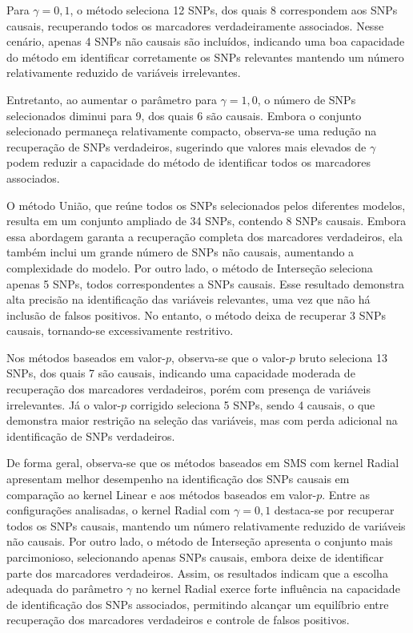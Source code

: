 \documentclass[
    12pt,
    a4paper,
    oneside,
    english,
    french,
    spanish,
    brazil
    ]{abntex2}
\begin{document}
Para $\gamma = 0{,}1$, o método seleciona 12 SNPs, dos quais 8 correspondem aos SNPs causais, recuperando todos os marcadores verdadeiramente associados. Nesse cenário, apenas 4 SNPs não causais são incluídos, indicando uma boa capacidade do método em identificar corretamente os SNPs relevantes mantendo um número relativamente reduzido de variáveis irrelevantes.

Entretanto, ao aumentar o parâmetro para $\gamma = 1{,}0$, o número de SNPs selecionados diminui para 9, dos quais 6 são causais. Embora o conjunto selecionado permaneça relativamente compacto, observa-se uma redução na recuperação de SNPs verdadeiros, sugerindo que valores mais elevados de $\gamma$ podem reduzir a capacidade do método de identificar todos os marcadores associados.

O método União, que reúne todos os SNPs selecionados pelos diferentes modelos, resulta em um conjunto ampliado de 34 SNPs, contendo 8 SNPs causais. Embora essa abordagem garanta a recuperação completa dos marcadores verdadeiros, ela também inclui um grande número de SNPs não causais, aumentando a complexidade do modelo. Por outro lado, o método de Interseção seleciona apenas 5 SNPs, todos correspondentes a SNPs causais. Esse resultado demonstra alta precisão na identificação das variáveis relevantes, uma vez que não há inclusão de falsos positivos. No entanto, o método deixa de recuperar 3 SNPs causais, tornando-se excessivamente restritivo.

Nos métodos baseados em valor-$p$, observa-se que o valor-$p$ bruto seleciona 13 SNPs, dos quais 7 são causais, indicando uma capacidade moderada de recuperação dos marcadores verdadeiros, porém com presença de variáveis irrelevantes. Já o valor-$p$ corrigido seleciona 5 SNPs, sendo 4 causais, o que demonstra maior restrição na seleção das variáveis, mas com perda adicional na identificação de SNPs verdadeiros.

De forma geral, observa-se que os métodos baseados em SMS com kernel Radial apresentam melhor desempenho na identificação dos SNPs causais em comparação ao kernel Linear e aos métodos baseados em valor-$p$. Entre as configurações analisadas, o kernel Radial com $\gamma = 0{,}1$ destaca-se por recuperar todos os SNPs causais, mantendo um número relativamente reduzido de variáveis não causais. Por outro lado, o método de Interseção apresenta o conjunto mais parcimonioso, selecionando apenas SNPs causais, embora deixe de identificar parte dos marcadores verdadeiros. Assim, os resultados indicam que a escolha adequada do parâmetro $\gamma$ no kernel Radial exerce forte influência na capacidade de identificação dos SNPs associados, permitindo alcançar um equilíbrio entre recuperação dos marcadores verdadeiros e controle de falsos positivos.
\end{document}
